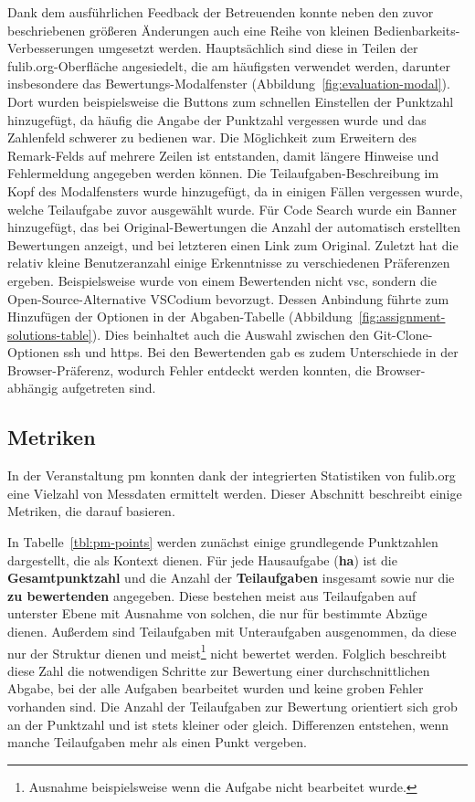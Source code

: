 Dank dem ausführlichen Feedback der Betreuenden konnte neben den zuvor beschriebenen größeren Änderungen auch eine Reihe von kleinen Bedienbarkeits-Verbesserungen umgesetzt werden.
Hauptsächlich sind diese in Teilen der fulib.org-Oberfläche angesiedelt, die am häufigsten verwendet werden, darunter insbesondere das Bewertungs-Modalfenster (Abbildung~\ref{fig:evaluation-modal}).
Dort wurden beispielsweise die Buttons zum schnellen Einstellen der Punktzahl hinzugefügt, da häufig die Angabe der Punktzahl vergessen wurde und das Zahlenfeld schwerer zu bedienen war.
Die Möglichkeit zum Erweitern des Remark-Felds auf mehrere Zeilen ist entstanden, damit längere Hinweise und Fehlermeldung angegeben werden können.
Die Teilaufgaben-Beschreibung im Kopf des Modalfensters wurde hinzugefügt, da in einigen Fällen vergessen wurde, welche Teilaufgabe zuvor ausgewählt wurde.
Für Code Search wurde ein Banner hinzugefügt, das bei Original-Bewertungen die Anzahl der automatisch erstellten Bewertungen anzeigt, und bei letzteren einen Link zum Original.
Zuletzt hat die relativ kleine Benutzeranzahl einige Erkenntnisse zu verschiedenen Präferenzen ergeben.
Beispielsweise wurde von einem Bewertenden nicht \ac{vsc}, sondern die Open-Source-Alternative VSCodium bevorzugt.
Dessen Anbindung führte zum Hinzufügen der Optionen in der Abgaben-Tabelle (Abbildung~\ref{fig:assignment-solutions-table}).
Dies beinhaltet auch die Auswahl zwischen den Git-Clone-Optionen \ac{ssh} und \ac{https}.
Bei den Bewertenden gab es zudem Unterschiede in der Browser-Präferenz, wodurch Fehler entdeckt werden konnten, die Browser-abhängig aufgetreten sind.

\subsection{Metriken}\label{subsec:pm-metrics}

In der Veranstaltung \ac{pm} konnten dank der integrierten Statistiken von fulib.org eine Vielzahl von Messdaten ermittelt werden.
Dieser Abschnitt beschreibt einige Metriken, die darauf basieren.

In Tabelle~\ref{tbl:pm-points} werden zunächst einige grundlegende Punktzahlen dargestellt, die als Kontext dienen.
Für jede Hausaufgabe (\textbf{\acs{ha}}) ist die \textbf{Gesamtpunktzahl} und die Anzahl der \textbf{Teilaufgaben} insgesamt sowie nur die \textbf{zu bewertenden} angegeben.
Diese bestehen meist aus Teilaufgaben auf unterster Ebene mit Ausnahme von solchen, die nur für bestimmte Abzüge dienen.
Außerdem sind Teilaufgaben mit Unteraufgaben ausgenommen, da diese nur der Struktur dienen und meist\footnote{
    Ausnahme beispielsweise wenn die Aufgabe nicht bearbeitet wurde.
} nicht bewertet werden.
Folglich beschreibt diese Zahl die notwendigen Schritte zur Bewertung einer durchschnittlichen Abgabe, bei der alle Aufgaben bearbeitet wurden und keine groben Fehler vorhanden sind.
Die Anzahl der Teilaufgaben zur Bewertung orientiert sich grob an der Punktzahl und ist stets kleiner oder gleich.
Differenzen entstehen, wenn manche Teilaufgaben mehr als einen Punkt vergeben.

